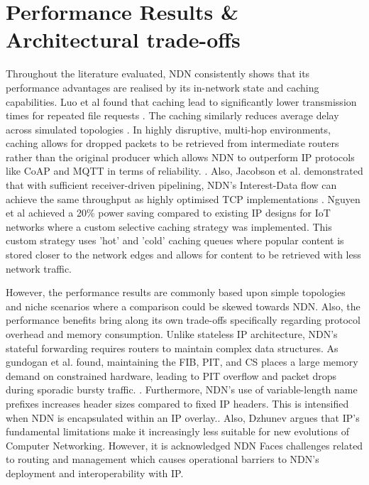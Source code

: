 \documentclass[12pt]{report}
\begin{document}
    \section{Performance Results \& Architectural trade-offs}
    Throughout the literature evaluated, NDN consistently shows that its performance advantages are realised by its in-network state and caching capabilities. Luo et al found that caching lead to significantly lower transmission times for repeated file requests \cite{luo_ipndn_2018}. The caching similarly reduces average delay across simulated topologies \cite{kumar_comparing_2022}. In highly disruptive, multi-hop environments, caching allows for dropped packets to be retrieved from intermediate routers rather than the original producer which allows NDN to outperform IP protocols like CoAP and MQTT in terms of reliability. \cite{gundogan_ndn_2018}. Also, Jacobson et al. demonstrated that with sufficient receiver-driven pipelining, NDN's Interest-Data flow can achieve the same throughput as highly optimised TCP implementations \cite{jacobson_networking_2009}. Nguyen et al\cite{nguyen_cross-layer_2022} achieved a 20\% power saving compared to existing IP designs for IoT networks where a custom selective caching strategy was implemented. This custom strategy uses 'hot' and 'cold' caching queues where popular content is stored closer to the network edges and allows for content to be retrieved with less network traffic. 

    However, the performance results are commonly based upon simple topologies and niche scenarios where a comparison could be skewed towards NDN. Also, the performance benefits bring along its own trade-offs specifically regarding protocol overhead and memory consumption. Unlike stateless IP architecture, NDN's stateful forwarding requires routers to maintain complex data structures. As gundogan et al. found, maintaining the FIB, PIT, and CS places a large memory demand on constrained hardware, leading to PIT overflow and packet drops during sporadic bursty traffic. \cite{gundogan_ndn_2018}. Furthermore, NDN's use of variable-length name prefixes increases header sizes compared to fixed IP headers. This is intensified when NDN is encapsulated within an IP overlay.\cite{jacobson_networking_2009}. Also, Dzhunev argues that IP's fundamental limitations make it increasingly less suitable for new evolutions of Computer Networking. However, it is acknowledged NDN Faces challenges related to routing and management which causes operational barriers to NDN's deployment and interoperability with IP\cite{dzhunev_comparative_2025}.
\end{document}
